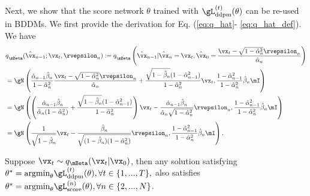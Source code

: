 Next, we show that the score network $\theta$ trained with $\gL_\text{ddpm}^{(t)}(\theta)$ can be re-used in BDDMs. We first provide the derivation for Eq. (\ref{eq:q_hat}- \ref{eq:q_hat_def}). We have
\begin{align}
    &q_{\hat{\mBeta}}(\hat{\vx}_{n-1};\vx_t, \rvepsilon_n)
    :=q_{\hat{\mBeta}}\left(\hat{\vx}_{n-1}|\hat{\vx}_{n}=\vx_t, \hat{\vx}_{0}=\frac
        {\vx_t-\sqrt{1-\hat{\alpha}_n^2}\rvepsilon_n}{\hat{\alpha}_n}\right)\\
    &=
    \gN
    \left(
        \frac
        {\hat{\alpha}_{n-1}\hat{\beta}_n}{1-\hat{\alpha}_n^2}
        \frac
        {\vx_t-\sqrt{1-\hat{\alpha}_n^2}\rvepsilon_n}{\hat{\alpha}_n}
        +
        \frac
        {\sqrt{1-\hat{\beta}_n}(1-\hat{\alpha}_{n-1}^2)}{1-\hat{\alpha}_n^2}\vx_t
        ,
        \frac{1-\hat{\alpha}_{n-1}^2}{1-\hat{\alpha}_n^2}\hat{\beta}_n
        \mI
    \right)\\
    &=
    \gN
    \left(
        \left(
        \frac
        {\hat{\alpha}_{n-1}\hat{\beta}_n}{\hat{\alpha}_{n}(1-\hat{\alpha}_n^2)}
        +
        \frac
        {\sqrt{1-\hat{\beta}_n}(1-\hat{\alpha}_{n-1}^2)}{1-\hat{\alpha}_n^2}
        \right)
        \vx_t
        -
        \frac
        {\hat{\alpha}_{n-1}\hat{\beta}_n}{\hat{\alpha}_{n}\sqrt{1-\hat{\alpha}_n^2}}\rvepsilon_n
        ,
        \frac{1-\hat{\alpha}_{n-1}^2}{1-\hat{\alpha}_n^2}\hat{\beta}_n
        \mI
    \right)\\
    \label{eq:epsilon_scale}
    &=
    \gN
    \left(
        \frac
        {1}{\sqrt{1-\hat{\beta}_{n}}}
        \vx_t
        -
        \frac
        {\hat{\beta}_n}{\sqrt{(1-\hat{\beta}_n)(1-\hat{\alpha}_n^2)}}
        \rvepsilon_n
        ,
        \frac{1-\hat{\alpha}_{n-1}^2}{1-\hat{\alpha}_n^2}\hat{\beta}_n
        \mI
    \right).
\end{align}
\begin{proposition}
\label{prop:theta}
Suppose $\vx_t\sim q_\mBeta(\vx_{t}|\vx_0)$, then any solution satisfying $\theta^*=\text{argmin}_\theta \gL^{(t)}_\text{ddpm}(\theta), \forall t\in \{1, ..., T\},$ also satisfies $\theta^*=\text{argmin}_\theta \gL^{(n)}_\text{score}(\theta), \forall n\in \{2, ..., N\}$.
\end{proposition}
